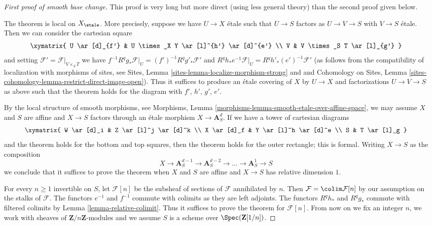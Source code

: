 \begin{proof}[First proof of smooth base change]
This proof is very long but more direct (using less general theory)
than the second proof given below.

\medskip\noindent
The theorem is local on $X_\etale$. More precisely, suppose we have
$U \to X$ \'etale such that $U \to S$ factors as $U \to V \to S$
with $V \to S$ \'etale. Then we can consider the cartesian square
$$
\xymatrix{
U \ar[d]_{f'} & U \times_X Y \ar[l]^{h'} \ar[d]^{e'} \\
V & V \times_S T \ar[l]_{g'}
}
$$
and setting $\mathcal{F}' = \mathcal{F}|_{V \times_S T}$
we have $f^{-1}R^qg_*\mathcal{F}|_U = (f')^{-1}R^qg'_*\mathcal{F}'$
and $R^qh_*e^{-1}\mathcal{F}|_U = R^qh'_*(e')^{-1}\mathcal{F}'$
(as follows from the compatibility of localization with morphisms of sites, see
Sites, Lemma \ref{sites-lemma-localize-morphism-strong} and
and
Cohomology on Sites, Lemma
\ref{sites-cohomology-lemma-restrict-direct-image-open}).
Thus it suffices to produce an \'etale covering of $X$ by
$U \to X$ and factorizations $U \to V \to S$
as above such that the theorem holds for the diagram with
$f'$, $h'$, $g'$, $e'$.

\medskip\noindent
By the local structure of smooth morphisms, see
Morphisms, Lemma \ref{morphisms-lemma-smooth-etale-over-affine-space},
we may assume $X$ and $S$ are affine and $X \to S$
factors through an \'etale morphism $X \to \mathbf{A}^d_S$.
If we have a tower of cartesian diagrams
$$
\xymatrix{
W \ar[d]_i & Z \ar[l]^j \ar[d]^k \\
X \ar[d]_f & Y \ar[l]^h \ar[d]^e \\
S & T \ar[l]_g
}
$$
and the theorem holds for the bottom and top squares, then
the theorem holds for the outer rectangle; this is formal.
Writing $X \to S$ as the composition
$$
X \to \mathbf{A}^{d - 1}_S \to \mathbf{A}^{d - 2}_S \to \ldots \to
\mathbf{A}^1_S \to S
$$
we conclude that it suffices to prove the theorem when $X$ and $S$
are affine and $X \to S$ has relative dimension $1$.

\medskip\noindent
For every $n \geq 1$ invertible on $S$, let $\mathcal{F}[n]$
be the subsheaf of sections of $\mathcal{F}$ annihilated by $n$. Then
$\mathcal{F} = \colim \mathcal{F}[n]$ by our assumption on
the stalks of $\mathcal{F}$. The functors $e^{-1}$ and $f^{-1}$
commute with colimits as they are left adjoints. The functors
$R^qh_*$ and $R^qg_*$ commute with filtered colimits by
Lemma \ref{lemma-relative-colimit}.
Thus it suffices to prove the theorem for $\mathcal{F}[n]$.
From now on we fix an integer $n$, we work with
sheaves of $\mathbf{Z}/n\mathbf{Z}$-modules and
we assume $S$ is a scheme over $\Spec(\mathbf{Z}[1/n])$.


\end{proof}
